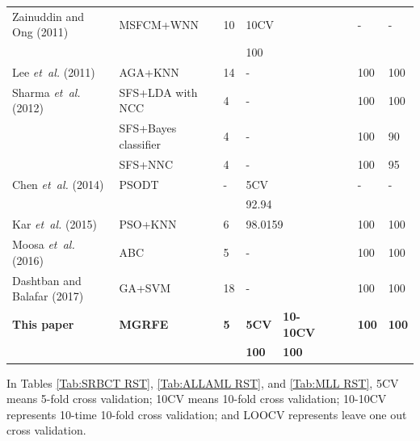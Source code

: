 \documentclass[10pt,journal,compsoc]{IEEEtran}
\begin{document}
\begin{table}[!tp]
{\begin{threeparttable}
\begin{tabular}{llllllllllll}
				Zainuddin and Ong (2011) \cite{P23} & MSFCM+WNN & \multicolumn{4}{l}{10} & \multicolumn{4}{l}{10CV} & {-} & {-}\\
				\cline{7-7}
				\multicolumn{6}{l}{} & \multicolumn{4}{l}{100} & & \\

				Lee \emph{et~al.} (2011) \cite{P14} & AGA+KNN & \multicolumn{4}{l}{14} & \multicolumn{4}{l}{-} & 100 & 100\\
				Sharma \emph{et~al.} (2012) \cite{P18}
				& SFS+LDA with NCC & \multicolumn{4}{l}{4} & \multicolumn{4}{l}{-} & 100 & 100 \\
				& SFS+Bayes classifier & \multicolumn{4}{l}{4} & \multicolumn{4}{l}{-} & 100 & 90 \\
				& SFS+NNC & \multicolumn{4}{l}{4} & \multicolumn{4}{l}{-} & 100 & 95\\

				Chen \emph{et~al.} (2014) \cite{W5} & PSODT & \multicolumn{4}{l}{-} & \multicolumn{4}{l}{5CV} & {-} & {-} \\
				\cline{7-7}
				\multicolumn{6}{l}{} & \multicolumn{4}{l}{92.94} & & \\
				Kar \emph{et~al.} (2015) \cite{W15} & PSO+KNN & \multicolumn{4}{l}{6} & \multicolumn{4}{l}{98.0159} & 100 & 100\\
				Moosa \emph{et~al.} (2016) \cite{P32} & ABC & \multicolumn{4}{l}{5} & \multicolumn{4}{l}{-} & 100 & 100\\
				Dashtban and Balafar (2017) \cite{P33} & GA+SVM & \multicolumn{4}{l}{18} & \multicolumn{4}{l}{-} & 100 & 100\\
				
				\textbf{This paper} & \textbf{MGRFE} & \multicolumn{4}{l}{\textbf{5}} & \textbf{5CV} & \textbf{10-10CV} & \multicolumn{2}{l}{} & \textbf{100} & \textbf{100}\\
				\cline{7-8}
				\multicolumn{6}{l}{} & \textbf{100} & \textbf{100}\\
				\bottomrule
			\end{tabular}
	   		\begin{tablenotes}
		    \item In Tables \ref{Tab:SRBCT RST}, \ref{Tab:ALLAML RST}, and \ref{Tab:MLL RST}, 5CV means 5-fold cross validation; 10CV means 10-fold cross validation; 10-10CV represents 10-time 10-fold cross validation; and LOOCV represents leave one out cross validation.
	   		\end{tablenotes}
	   	\end{threeparttable}}
	\end{table}
	
\end{document}
